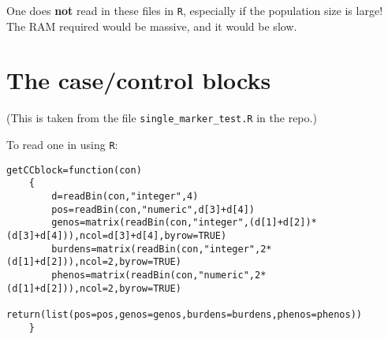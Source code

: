 \documentclass{article}
\begin{document}
One does \textbf{not} read in these files in \texttt{R}, especially if the population size is large!  The RAM required would be massive, and it would be slow.

\section*{The case/control blocks}

(This is taken from the file \texttt{single\_marker\_test.R} in the repo.)

To read one in using \texttt{R}:

\begin{lstlisting}
getCCblock=function(con)
    {
        d=readBin(con,"integer",4)
        pos=readBin(con,"numeric",d[3]+d[4])
        genos=matrix(readBin(con,"integer",(d[1]+d[2])*(d[3]+d[4])),ncol=d[3]+d[4],byrow=TRUE)
        burdens=matrix(readBin(con,"integer",2*(d[1]+d[2])),ncol=2,byrow=TRUE)
        phenos=matrix(readBin(con,"numeric",2*(d[1]+d[2])),ncol=2,byrow=TRUE)
        return(list(pos=pos,genos=genos,burdens=burdens,phenos=phenos))
    }
\end{lstlisting}
\end{document}
